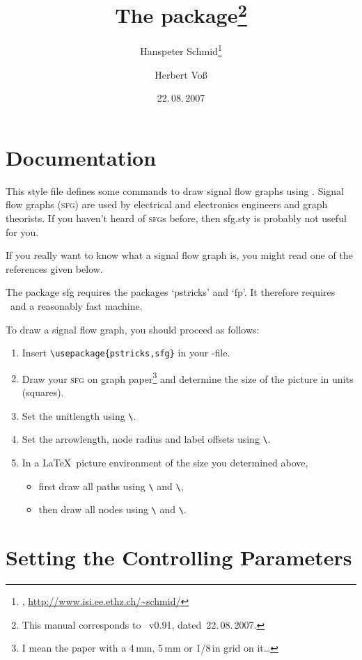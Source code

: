\documentclass[pagesize=auto, parskip=half]{scrartcl}
\title{The \pkg{sfg} package\thanks{This manual corresponds to \pkg{sfg}~v0.91, dated~22.\,08.\,2007.}}
\author{Hanspeter Schmid\thanks{\mail{schmid@isi.ee.ethz.ch}, \url{http://www.isi.ee.ethz.ch/\~schmid/}}\and Herbert Voß}
\date{22.\,08.\,2007}
\makeatletter
\newcommand*{\pkg}[1]{\textsf{#1}}
\newcommand*{\cs}[1]{\texttt{\textbackslash#1}}
\newcommand*{\cmd}[1]{\cs{\expandafter\@gobble\string#1}}
\makeatother
\begin{document}
\maketitle


\section{Documentation}

This style file defines some commands to draw signal flow graphs using
\LaTeXe\@.  Signal flow graphs (\textsc{sfg}) are used by electrical and
electronics engineers and graph theorists.  If you haven't heard of
\textsc{sfg}s before, then \pkg{sfg.sty} is probably not useful for you.

If you really want to know what a signal flow graph is, you might read
one of the references given below.

The package sfg requires the packages `\pkg{pstricks}' and `\pkg{fp}'.  It
therefore requires \LaTeXe\ and a reasonably fast machine.

To draw a signal flow graph, you should proceed as follows:
%
\begin{enumerate}
\item Insert \verb|\usepackage{pstricks,sfg}| in your \LaTeXe-file.
\item Draw your \textsc{sfg} on graph paper\footnote{I mean the paper with a 4\,mm, 5\,mm or 1/8\,in grid on it\dots} and determine the size of the 
  picture in units (squares).
\item Set the unitlength using \cmd{\sfgsetunit}.
\item Set the arrowlength, node radius and label offsets using \cmd{\sfgsetsize}.
\item In a \LaTeX\ picture environment of the size you determined above,
  \begin{itemize}
  \item first draw all paths using \cmd{\sfgbranch} and \cmd{\sfgcurve},
  \item then draw all nodes using \cmd{\sfgnode} and \cmd{\sfgtermnode}.
  \end{itemize}
\end{enumerate}


\section{Setting the Controlling Parameters}
\end{document}
